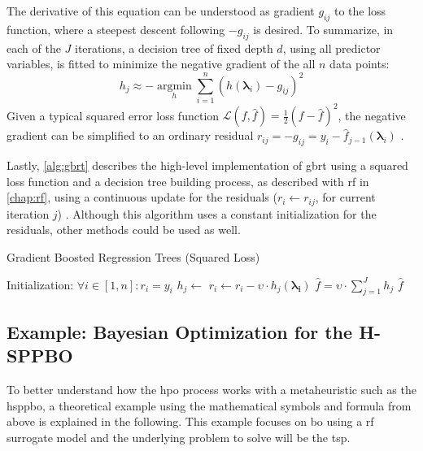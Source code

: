 The derivative of this equation can be understood as gradient $g_{ij}$ to the loss function, where a steepest descent following $-g_{ij}$ is desired. To summarize, in each of the $J$ iterations, a decision tree of fixed depth $d$, using all predictor variables, is fitted to minimize the negative gradient of the all $n$ data points:
\begin{equation}
	h_j \approx -\operatorname*{argmin}_{h} \sum_{i=1}^{n} (h(\mathbf{\lambda}_i) - g_{ij})^2
\end{equation}
Given a typical squared error loss function $\mathcal{L}(f, \hat{f}) = \frac{1}{2}(f - \hat{f})^2$, the negative gradient can be simplified to an ordinary residual $r_{ij} = -g_{ij} = y_i - \hat{f}_{j-1}(\mathbf{\lambda}_i)$ \cite[Chapter~10]{hastie2009elements}.

Lastly, \cref{alg:gbrt} describes the high-level implementation of \gls{gbrt} using a squared loss function and a decision tree building process, as described with \gls{rf} in \cref{chap:rf}, using a continuous update for the residuals ($r_{i} \gets r_{ij}$, for current iteration $j$) \cite{mohan2011web}.
Although this algorithm uses a constant initialization for the residuals, other methods could be used as well.

\begin{algorithm}
	\caption{Gradient Boosted Regression Trees (Squared Loss)}
	\label{alg:gbrt}
	\begin{algorithmic}
		\State Initialization: $\forall i \in [1,n]: r_i = y_i$
			\State$h_j \gets$ 
				\State $r_i \gets r_i - \upsilon \cdot h_j(\mathbf{\lambda_i})$
			\EndFor
		\EndFor
		\State $\hat{f} = \upsilon \cdot \sum_{j=1}^{J} h_j$
		\State \Return $\hat{f}$
	\end{algorithmic}
\end{algorithm}


\subsection{Example: Bayesian Optimization for the H-SPPBO}
To better understand how the \glsdesc{hpo} process works with a metaheuristic such as the \gls{hsppbo}, a theoretical example using the mathematical symbols and formula from above is explained in the following. This example focuses on \gls{bo} using a \gls{rf} surrogate model and the underlying problem to solve will be the \gls{tsp}.

